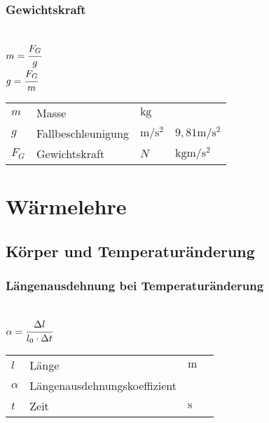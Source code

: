 \documentclass[a4paper, 11pt]{article}
\begin{document}
\subsubsection{Gewichtskraft}
\begin{minipage}{0.45\textwidth}

 \\
$m = \cfrac{F_G}{g}$ \\
$g = \cfrac{F_G}{m}$

\end{minipage}
\begin{minipage}{0.45\textwidth}

\begin{tabular}{llll}
$m$ & Masse & $\si{\kilo\gram}$ & \\
$g$ & Fallbeschleunigung & $\si{\metre\per\square\second}$ & $9,81 \si{\metre\per\square\second}$ \\
$F_G$ & Gewichtskraft & $N$ & $\si{\kilogram\metre\per\square\second}$ \\
\end{tabular}

\end{minipage}

\section{Wärmelehre}

\subsection{Körper und Temperaturänderung}
\subsubsection{Längenausdehnung bei Temperaturänderung}
\begin{minipage}{0.45\textwidth}
  \\
$\alpha = \cfrac{\Delta l}{l_0 \cdot \Delta t}$
\end{minipage}
\begin{minipage}{0.45\textwidth}

\begin{tabular}{llll}
$l$ & Länge & $\si{\meter} $ & $ $ \\
$\alpha$ & Längenausdehnungskoeffizient &  & \\
$t$ & Zeit & $\si{\second}$ & \\
\end{tabular}

\end{minipage}
\end{document}
